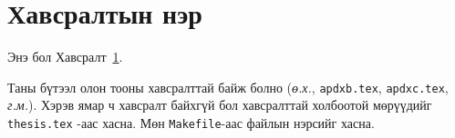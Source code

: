 \chapter{Хавсралтын нэр}
\label{apdx:A}
Энэ бол Хавсралт~\ref{apdx:A}.

Таны бүтээл олон тооны хавсралттай байж болно
(\emph{ө.х.}, \texttt{apdxb.tex}, \texttt{apdxc.tex}, \emph{г.м.}).
Хэрэв ямар ч хавсралт байхгүй бол хавсралттай холбоотой мөрүүдийг \texttt{thesis.tex} -аас хасна. Мөн \texttt{Makefile}-аас файлын нэрсийг хасна.
